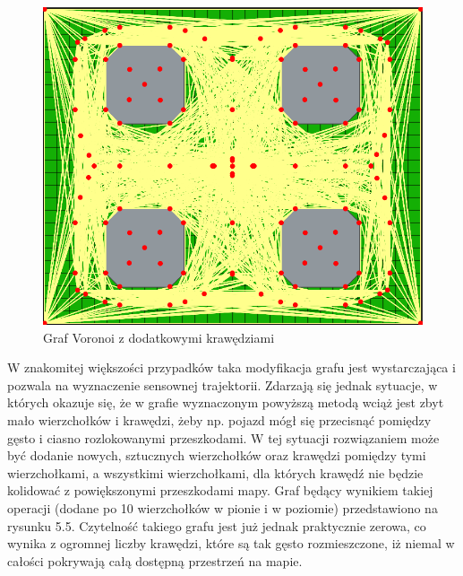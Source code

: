 \documentclass[a4paper,11pt,twoside]{report}
\theoremstyle{definition}
\begin{document}
\begin{figure}[h!]
\centering
\includegraphics[scale=0.4]{fullVoronoiGraphForExpandedMap}
\caption[Graf Voronoi z dodatkowymi krawędziami]{Graf Voronoi z dodatkowymi krawędziami}
\end{figure}

W znakomitej większości przypadków taka modyfikacja grafu jest wystarczająca i pozwala na wyznaczenie sensownej trajektorii. Zdarzają się jednak sytuacje, w których okazuje się, że w grafie wyznaczonym powyższą metodą wciąż jest zbyt mało wierzchołków i krawędzi, żeby np. pojazd mógł się przecisnąć pomiędzy gęsto i ciasno rozlokowanymi przeszkodami. W tej sytuacji rozwiązaniem może być dodanie nowych, sztucznych wierzchołków oraz krawędzi pomiędzy tymi wierzchołkami, a wszystkimi wierzchołkami, dla których krawędź nie będzie kolidować z powiększonymi przeszkodami mapy. Graf będący wynikiem takiej operacji (dodane po 10 wierzchołków w pionie i w poziomie) przedstawiono na rysunku 5.5. Czytelność takiego grafu jest już jednak praktycznie zerowa, co wynika z ogromnej liczby krawędzi, które są tak gęsto rozmieszczone, iż niemal w całości pokrywają całą dostępną przestrzeń na mapie.
\end{document}
